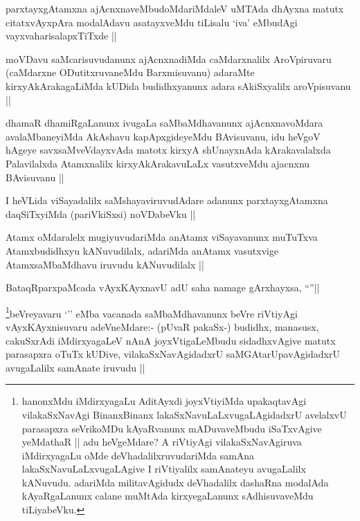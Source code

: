 \begin{artha}
parxtayxgAtamxna ajAcnxnaveMbudoMdariMdaleV uMTAda dhAyxna matutx citatxvAyxpAra modalAdavu asatayxveMdu tiLisalu `iva' eMbudAgi vayxvaharisalapxTiTxde ||
\end{artha}

\begin{artha}
moVDavu saMcarisuvudanunx ajAcnxnadiMda caMdarxnalilx AroVpiruvaru (caMdarxne ODutitxruvaneMdu Barxmisuvanu) adaraMte kirxyAkArakagaLiMda kUDida budidhxyanunx adara sAkiSxyalilx aroVpisuvanu ||
\end{artha}

\begin{artha}
dhamaR dhamiRgaLanunx ivugaLa saMbaMdhavanunx ajAcnxnavoMdara avalaMbaneyiMda AkAshavu kapApxgideyeMdu BAvisuvanu, idu heVgoV hAgeye savxsaMveVdayxvAda matotx kirxyA shUnayxnAda kArakavalalxda Palavilalxda Atamxnalilx kirxyAkArakavuLaLx vasutxveMdu ajacnxnu BAvisuvanu ||
\end{artha}

\begin{artha}
I heVLida viSayadalilx saMshayaviruvudAdare adanunx parxtayxgAtamxna daqSiTxyiMda (pariVkiSxsi) noVDabeVku ||
\end{artha}

\begin{artha}
Atamx oMdaralelx mugiyuvudariMda anAtamx viSayavanunx muTuTxva Atamxbudidhxyu kANuvudilalx, adariMda anAtamx vasutxvige AtamxsaMbaMdhavu iruvudu kANuvudilalx ||
\end{artha}


\begin{artha}
BataqRparxpaMcada vAyxKAyxnavU adU saha namage gArxhayxsa, ``\stext''||
\end{artha}

\begin{artha}
\footnote{hanonxMdu iMdirxyagaLu AditAyxdi joyxVtiyiMda upakaqtavAgi vilakaSxNavAgi BinanxBinanx lakaSxNavuLaLxvugaLAgidadxrU avelalxvU parasapxra seVrikoMDu kAyaRvanunx mADuvaveMbudu iSaTxvAgive yeMdathaR || adu heVgeMdare? A riVtiyAgi vilakaSxNavAgiruva iMdirxyagaLu oMde deVhadalilxruvudariMda samAna lakaSxNavuLaLxvugaLAgive I riVtiyalilx samAnateyu avugaLalilx kANuvudu. adariMda militavAgidudx deVhadalilx dashaRna modalAda kAyaRgaLanunx calane muMtAda kirxyegaLanunx sAdhisuvaveMdu tiLiyabeVku.}beVreyavaru `\stext'' eMba vacanada saMbaMdhavanunx beVre riVtiyAgi vAyxKAyxnisuvaru adeVneMdare:- (pUvaR pakaSx-) budidhx, manasusx, cakuSxrAdi iMdirxyagaLeV nAnA joyxVtigaLeMbudu sidadhxvAgive matutx parasapxra oTuTx kUDive, vilakaSxNavAgidadxrU saMGAtarUpavAgidadxrU avugaLalilx samAnate iruvudu ||
\end{artha}

